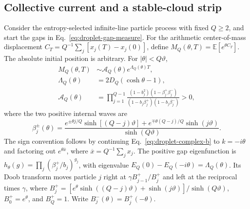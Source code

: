 \documentclass[aps,pre,reprint,amsmath,amssymb,longbibliography,floatfix]{revtex4-2}
\newcommand{\E}{\mathbb E}
\begin{document}
\subsection{Collective current and a stable-cloud strip}
\label{app:droplet-current}
Consider the entropy-selected infinite-line particle process with fixed
$Q\ge2$, and start the gaps in
Eq.~\eqref{eq:droplet-gap-measure}. For the arithmetic center-of-mass
displacement $C_T=Q^{-1}\sum_j\left[x_j(T)-x_j(0)\right]$, define
$M_Q(\theta,T)=\E\left[e^{\theta C_T}\right]$. The absolute initial position
is arbitrary. For $|\theta|<Q\vartheta$,
\begin{align}
 M_Q(\theta,T)&\sim\mathcal A_Q(\theta)e^{\Lambda_Q(\theta)T},\nonumber\\
 \Lambda_Q(\theta)&=2D_Q(\cosh\theta-1),\label{eq:droplet-current-SCGF}\\
 \mathcal A_Q(\theta)&=\prod_{j=1}^{Q-1}
 \frac{(1-b_j^2)(1-\beta_j^+\beta_j^-)}
 {(1-b_j\beta_j^+)(1-b_j\beta_j^-)}>0,\label{eq:droplet-current-amplitude}
\end{align}
where the two positive internal waves are
\begin{equation}
 \beta_j^\pm(\theta)=\frac{e^{\pm\theta j/Q}\sinh\left[(Q-j)\vartheta\right]
 +e^{\mp\theta(Q-j)/Q}\sinh(j\vartheta)}{\sinh(Q\vartheta)}.
 \label{eq:droplet-current-beta}
\end{equation}
The sign convention follows by continuing Eq.~\eqref{eq:droplet-complex-b}
to $k=-i\theta$ and factoring out $e^{\theta\overline x}$, where
$\overline x=Q^{-1}\sum_jx_j$.
The positive gap eigenfunction is
$h_\theta(g)=\prod_j(\beta_j^+/b_j)^{g_j}$, with eigenvalue
$E_Q(0)-E_Q(-i\theta)=\Lambda_Q(\theta)$. Its Doob transform moves
particle $j$ right at $\gamma B_{j-1}^+/B_j^+$ and left at the reciprocal
times $\gamma$, where
$B_j^+=\left[e^\theta\sinh((Q-j)\vartheta)+\sinh(j\vartheta)\right]/\sinh(Q\vartheta)$,
$B_0^+=e^\theta$, and $B_Q^+=1$. Write $B_j^-(\theta)=B_j^+(-\theta)$.
\end{document}
